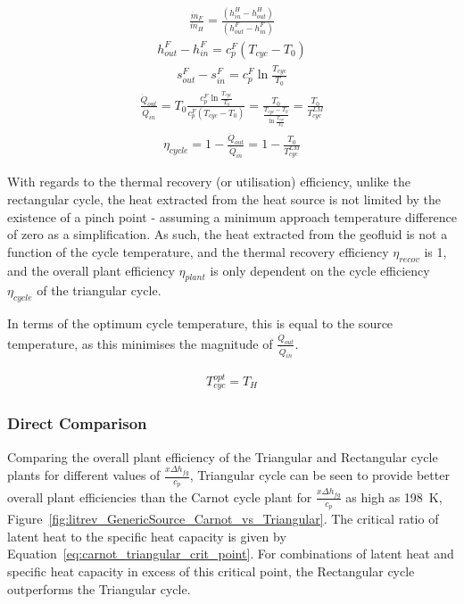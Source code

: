         \begin{align}
            \frac{\Dot{m}_{F}}{\Dot{m}_{H}}=\frac{(h_{in}^{H}-h_{out}^{H})}{(h_{out}^{F}-h_{in}^{F})} \label{eq:tri_Mratio}
        \end{align}
        \begin{align}
            h_{out}^{F}-h_{in}^{F}=c_p^F(T_{cyc}-T_0) \label{eq:tri_deltah}
        \end{align}
        \begin{align}
            s_{out}^{F}-s_{in}^{F}=c_p^F \ln \frac{T_{cyc}}{T_0} \label{eq:tri_deltas}
        \end{align}        
        \begin{align}
            \frac{\Dot{Q}_{out}}{\Dot{Q}_{in}} = T_0\frac{c_p^F \ln \frac{T_{cyc}}{T_0}}{c_p^F(T_{cyc}-T_0)}=\frac{T_0}{\frac{T_{cyc}-T_0}{\ln \frac{T_{cyc}}{T_0}}}=\frac{T_0}{T_{cyc}^{LM}} \label{eq:tri_Qratio3}
        \end{align}
        \begin{align}
            \eta_{cycle} = 1-\frac{\Dot{Q}_{out}}{\Dot{Q}_{in}} = 1-  \frac{T_0}{T_{cyc}^{LM}} \label{eq:tri_eff_cyc}
        \end{align}

        With regards to the thermal recovery (or utilisation) efficiency, unlike the rectangular cycle, the heat extracted from the heat source is not limited by the existence of a pinch point - assuming a minimum approach temperature difference of zero as a simplification. As such, the heat extracted from the geofluid is not a function of the cycle temperature, and the thermal recovery efficiency \(\eta_{recov}\) is \num{1}, and the overall plant efficiency \(\eta_{plant}\) is only dependent on the cycle efficiency \(\eta_{cycle}\) of the triangular cycle. 

        In terms of the optimum cycle temperature, this is equal to the source temperature, as this minimises the magnitude of \(\frac{\Dot{Q}_{out}}{\Dot{Q}_{in}}\).

        \begin{align}
            T_{cyc}^{opt} = T_H \label{eq:tri_T_cyc_opt}
        \end{align}

        \subsubsection{Direct Comparison}

         Comparing the overall plant efficiency of the Triangular and Rectangular cycle plants for different values of \(\frac{x\Delta h_{fg}}{c_p}\), Triangular cycle can be seen to provide better overall plant efficiencies than the Carnot cycle plant for \(\frac{x\Delta h_{fg}}{c_p}\) as high as \qty{198}{K}, Figure~\ref{fig:litrev_GenericSource_Carnot_vs_Triangular}. The critical ratio of latent heat to the specific heat capacity is given by Equation~\ref{eq:carnot_triangular_crit_point}. For combinations of latent heat and specific heat capacity in excess of this critical point, the Rectangular cycle outperforms the Triangular cycle.

